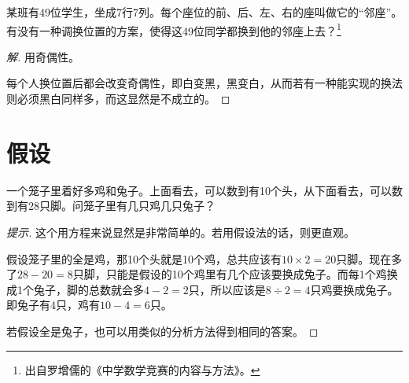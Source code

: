 \begin{example}
  某班有49位学生，坐成7行7列。每个座位的前、后、左、右的座叫做它的“邻座”。有没有一种调换位置的方案，使得这49位同学都换到他的邻座上去？\footnote{出自罗增儒的《中学数学竞赛的内容与方法》。}
\end{example}
\begin{proof}[解]用奇偶性。
    \begin{center}
  \end{center}
  每个人换位置后都会改变奇偶性，即白变黑，黑变白，从而若有一种能实现的换法则必须黑白同样多，而这显然是不成立的。
\end{proof}

\section{假设}
\label{sec:assumption}

\begin{example}[鸡兔同笼]
  一个笼子里着好多鸡和兔子。上面看去，可以数到有10个头，从下面看去，可以数到有28只脚。问笼子里有几只鸡几只兔子？
\end{example}
\begin{proof}[提示]
  这个用方程来说显然是非常简单的。若用假设法的话，则更直观。

  假设笼子里的全是鸡，那10个头就是10个鸡，总共应该有$10\times2=20$只脚。现在多了$28-20=8$只脚，只能是假设的10个鸡里有几个应该要换成兔子。而每1个鸡换成1个兔子，脚的总数就会多$4-2=2$只，所以应该是$8\div 2=4$只鸡要换成兔子。即兔子有$4$只，鸡有$10-4=6$只。

  若假设全是兔子，也可以用类似的分析方法得到相同的答案。
\end{proof}

